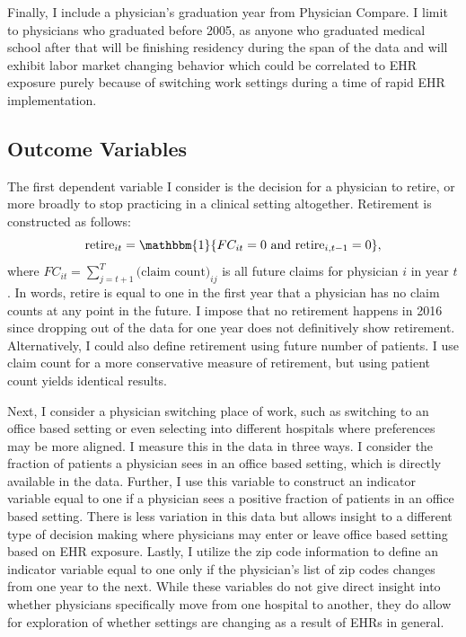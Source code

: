 \documentclass[11pt]{article}
\begin{document}
Finally, I include a physician's graduation year from Physician Compare. I limit to physicians who graduated before 2005, as anyone who graduated medical school after that will be finishing residency during the span of the data and will exhibit labor market changing behavior which could be correlated to EHR exposure purely because of switching work settings during a time of rapid EHR implementation.

\subsection{Outcome Variables}

The first dependent variable I consider is the decision for a physician to retire, or more broadly to stop practicing in a clinical setting altogether. Retirement is constructed as follows: 
$$\text{retire}_{it}=\mathbbm{1}\{FC_{it}=0 \text{ and retire}_{i,t-1}=0\}, $$
where $FC_{it}=\sum\limits_{j=t+1}^T\text{(claim count)}_{ij}$ is all future claims for physician $i$ in year $t$. In words, retire is equal to one in the first year that a physician has no claim counts at any point in the future. I impose that no retirement happens in 2016 since dropping out of the data for one year does not definitively show retirement. Alternatively, I could also define retirement using future number of patients. I use claim count for a more conservative measure of retirement, but using patient count yields identical results.

Next, I consider a physician switching place of work, such as switching to an office based setting or even selecting into different hospitals where preferences may be more aligned. I measure this in the data in three ways. I consider the fraction of patients a physician sees in an office based setting, which is directly available in the data. Further, I use this variable to construct an indicator variable equal to one if a physician sees a positive fraction of patients in an office based setting. There is less variation in this data but allows insight to a different type of decision making where physicians may enter or leave office based setting based on EHR exposure. Lastly, I utilize the zip code information to define an indicator variable equal to one only if the physician's list of zip codes changes from one year to the next. While these variables do not give direct insight into whether physicians specifically move from one hospital to another, they do allow for exploration of whether settings are changing as a result of EHRs in general.
\end{document}
